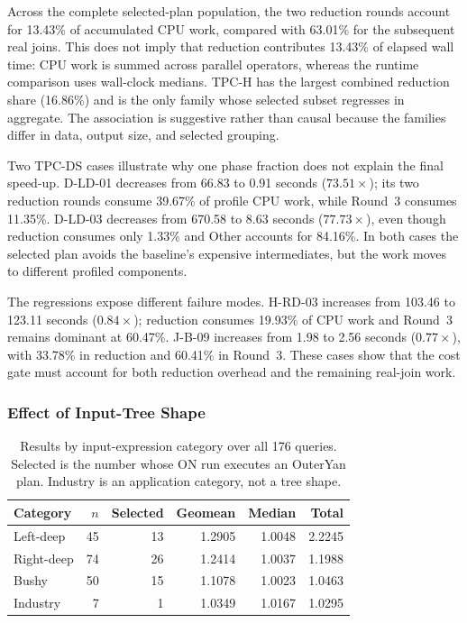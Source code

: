 Across the complete selected-plan population, the two reduction rounds account
for 13.43\% of accumulated CPU work, compared with 63.01\% for the subsequent
real joins. This does not imply that reduction contributes 13.43\% of elapsed
wall time: CPU work is summed across parallel operators, whereas the runtime
comparison uses wall-clock medians. TPC-H has the largest combined reduction
share (16.86\%) and is the only family whose selected subset regresses in
aggregate. The association is suggestive rather than causal because the
families differ in data, output size, and selected grouping.

Two TPC-DS cases illustrate why one phase fraction does not explain the final
speed-up. D-LD-01 decreases from 66.83 to 0.91 seconds
($73.51\times$); its two reduction rounds consume 39.67\% of profile CPU work,
while Round~3 consumes 11.35\%. D-LD-03 decreases from 670.58 to 8.63 seconds
($77.73\times$), even though reduction consumes only 1.33\% and Other accounts
for 84.16\%. In both cases the selected plan avoids the baseline's expensive
intermediates, but the work moves to different profiled components.

The regressions expose different failure modes. H-RD-03 increases from 103.46
to 123.11 seconds ($0.84\times$); reduction consumes 19.93\% of CPU work and
Round~3 remains dominant at 60.47\%. J-B-09 increases from 1.98 to 2.56 seconds
($0.77\times$), with 33.78\% in reduction and 60.41\% in Round~3. These cases
show that the cost gate must account for both reduction overhead and the
remaining real-join work.

\subsubsection{Effect of Input-Tree Shape}
\label{sec:shape-effect}

\begin{table}[t]
\centering
\small
\setlength{\tabcolsep}{4pt}
\caption{Results by input-expression category over all 176 queries. Selected
is the number whose ON run executes an OuterYan plan. Industry is an
application category, not a tree shape.}
\label{tab:runtime-by-shape}
\begin{tabular}{lrrrrr}
\toprule
Category & $n$ & Selected & Geomean & Median & Total \\
\midrule
Left-deep  & 45 & 13 & 1.2905 & 1.0048 & 2.2245 \\
Right-deep & 74 & 26 & 1.2414 & 1.0037 & 1.1988 \\
Bushy      & 50 & 15 & 1.1078 & 1.0023 & 1.0463 \\
Industry   &  7 &  1 & 1.0349 & 1.0167 & 1.0295 \\
\bottomrule
\end{tabular}
\end{table}

